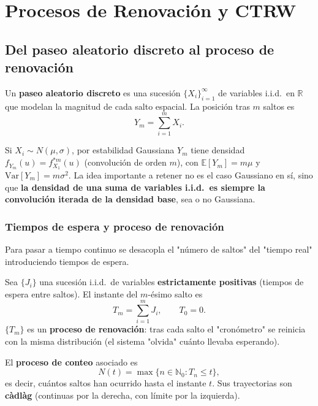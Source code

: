 \documentclass[10pt]{book}
\begin{document}
\chapter{Procesos de Renovación y CTRW}

\section{Del paseo aleatorio discreto al proceso de renovación}

\begin{definicion}
Un \textbf{paseo aleatorio discreto} es una sucesión $\{X_i\}_{i=1}^\infty$ de variables i.i.d.\ en $\mathbb{R}$ que modelan la magnitud de cada salto espacial. La posición tras $m$ saltos es
\begin{equation*}
    Y_m = \sum_{i=1}^m X_i.
\end{equation*}
\end{definicion}

\noindent
Si $X_i\sim N(\mu,\sigma)$, por estabilidad Gaussiana $Y_m$ tiene densidad $f_{Y_m}(u)=f_{X_1}^{*m}(u)$ (convolución de orden $m$), con $\mathbb{E}[Y_m]=m\mu$ y $\mathrm{Var}[Y_m]=m\sigma^2$. La idea importante a retener no es el caso Gaussiano en sí, sino que \textbf{la densidad de una suma de variables i.i.d.\ es siempre la convolución iterada de la densidad base}, sea o no Gaussiana.

\subsection*{Tiempos de espera y proceso de renovación}

Para pasar a tiempo continuo se desacopla el "número de saltos" del "tiempo real" introduciendo tiempos de espera.

\begin{definicion}
Sea $\{J_i\}$ una sucesión i.i.d.\ de variables \textbf{estrictamente positivas} (tiempos de espera entre saltos). El instante del $m$-ésimo salto es
\begin{equation*}
    T_m = \sum_{i=1}^m J_i, \qquad T_0=0.
\end{equation*}
$\{T_m\}$ es un \textbf{proceso de renovación}: tras cada salto el "cronómetro" se reinicia con la misma distribución (el sistema "olvida" cuánto llevaba esperando).
\end{definicion}

\begin{definicion}
El \textbf{proceso de conteo} asociado es
\begin{equation*}
    N(t) = \max\{n\in\mathbb{N}_0 : T_n \le t\},
\end{equation*}
es decir, cuántos saltos han ocurrido hasta el instante $t$. Sus trayectorias son \textbf{càdlàg} (continuas por la derecha, con límite por la izquierda).
\end{definicion}
\end{document}
